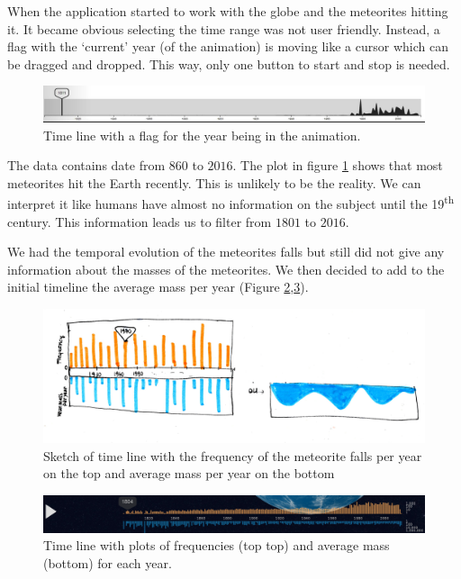 \documentclass[10pt,conference,compsocconf]{IEEEtran}
\begin{document}
When the application started to work with the globe and the meteorites hitting it. It became obvious selecting the time range was not user friendly. Instead, a flag with the `current' year (of the animation) is moving like a cursor which can be dragged and dropped. This way, only one button to start and stop is needed.

\begin{figure}[H]
  \centering
  \includegraphics[width=\columnwidth]{images/timeline_original.jpg}
  \vspace{-3mm}
  \caption{Time line with a flag for the year being in the animation.}
  \label{fig:timeline_all_dates}
\end{figure}

The data contains date from $860$ to $2016$. The plot in figure \ref{fig:timeline_all_dates} shows that most meteorites hit the Earth recently. This is unlikely to be the reality. We can interpret it like humans have almost no information on the subject until the 19\textsuperscript{th} century. This information leads us to filter from $1801$ to $2016$.

We had the temporal evolution of the meteorites falls but still did not give any information about the masses of the meteorites. We then decided to add to the initial timeline the average mass per year (Figure \ref{fig:timeline_sketch},\ref{fig:timeline_final_without_label}).

\begin{figure}[H]
  \centering
  \includegraphics[width=\columnwidth]{images/timeline_sketch}
  \vspace{-3mm}
  \caption{Sketch of time line with the frequency of the meteorite falls per year on the top and average mass per year on the bottom}
  \label{fig:timeline_sketch}
\end{figure}

\begin{figure}[H]
  \centering
  \includegraphics[width=\columnwidth]{images/timeline_final_without_label.png}
  \vspace{-3mm}
  \caption{Time line with plots of frequencies (top top) and average mass (bottom) for each year.}
  \label{fig:timeline_final_without_label}
\end{figure}
\end{document}
